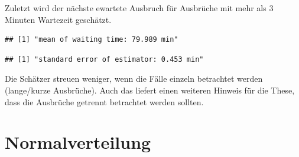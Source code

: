 \documentclass[10pt,]{article}
\newenvironment{Shaded}{\begin{snugshade}}{\end{snugshade}}
\newcommand{\KeywordTok}[1]{\textcolor[rgb]{0.13,0.29,0.53}{\textbf{{#1}}}}
\newcommand{\DecValTok}[1]{\textcolor[rgb]{0.00,0.00,0.81}{{#1}}}
\newcommand{\StringTok}[1]{\textcolor[rgb]{0.31,0.60,0.02}{{#1}}}
\newcommand{\CommentTok}[1]{\textcolor[rgb]{0.56,0.35,0.01}{\textit{{#1}}}}
\newcommand{\NormalTok}[1]{{#1}}
\begin{document}
Zuletzt wird der nächste ewartete Ausbruch für Ausbrüche mit mehr als 3
Minuten Wartezeit geschätzt.

\begin{Shaded}
\end{Shaded}

\begin{verbatim}
## [1] "mean of waiting time: 79.989 min"
\end{verbatim}

\begin{Shaded}
\end{Shaded}

\begin{verbatim}
## [1] "standard error of estimator: 0.453 min"
\end{verbatim}

Die Schätzer streuen weniger, wenn die Fälle einzeln betrachtet werden
(lange/kurze Ausbrüche). Auch das liefert einen weiteren Hinweis für die
These, dass die Ausbrüche getrennt betrachtet werden sollten.

\newpage

\section{Normalverteilung}\label{normalverteilung}
\end{document}
